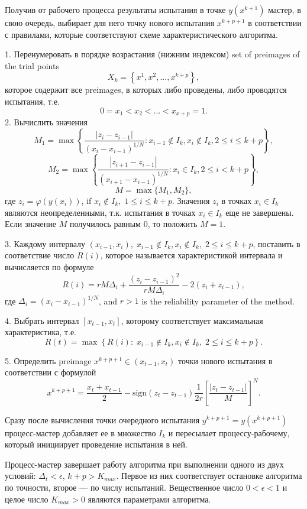 \documentclass{svproc}
\begin{document}
Получив от рабочего процесса результаты испытания в точке $y(x^{k+1})$ мастер, в свою очередь, выбирает для него точку нового испытания $x^{k+p+1}$ в соответствии с правилами, которые соответствуют схеме характеристического алгоритма.

1. Перенумеровать в порядке возрастания (нижним индексом) set of preimages of the trial points 
\[
X_k = \left\{x^1, x^2,...,x^{k+p} \right\},
\]
которое содержит все preimages, в которых либо проведены, либо проводятся испытания, т.е.
\[
0=x_1<x_2<...<x_{x+p}=1.
\]
2. Вычислить значения 
\[
M_1=\max \left\{ \frac{ \left|z_i - z_{i-1} \right|}{(x_i-x_{i-1})^{1/N}} : x_{i-1} \notin I_k, x_i \notin I_k, 2\leq i\leq k+p \right\},
\]
\[
M_2=\max \left\{ \frac{ \left|z_{i+1} - z_{i-1} \right|}{(x_{i+1}-x_{i-1})^{1/N}} : x_i \in I_k, 2\leq i < k+p \right\},
\]
\[
M=\max\{M_1,M_2\},
\]
где $z_i=\varphi(y(x_i))$, if $x_i \notin I_k, \; 1\leq i \leq k+p$. Значения $z_i$ в точках $x_i \in I_k$ являются неопределенными, т.к. испытания в точках $x_i \in I_k$ еще не завершены. Если значение $M$ получилось равным 0, то положить $M=1$.

3. Каждому интервалу $(x_{i-1},x_i), \; x_{i-1} \notin I_k, x_i \notin I_k, \; 2\leq i\leq k+p$, поставить в соответствие число $R(i)$, которое называется характеристикой интервала и вычисляется по формуле
\[
R(i)=rM\Delta_i+\frac{(z_i-z_{i-1})^2}{rM\Delta_i}-2(z_i+z_{i-1}),
\]
где $\Delta_i=\left(x_i-x_{i-1}\right)^{1/N}$, and $r>1$ is the reliability parameter of the method.

4. Выбрать интервал $[x_{t-1},x_t]$, которому соответствует максимальная характеристика, т.е.
\[
R(t) = \max \left\{ R(i): \; x_{i-1} \notin I_k, x_i \notin I_k, \; 2\leq i\leq k+p \right\}.
\]

5. Определить preimage $x^{k+p+1} \in (x_{t-1},x_t)$ точки нового испытания в соответствии с формулой
\[
x^{k+p+1} = \frac{x_{t}+x_{t-1}}{2} - \mathrm{sign}(z_{t}-z_{t-1})\frac{1}{2r}\left[\frac{\left|z_{t}-z_{t-1}\right|}{M}\right]^N.
\]

Сразу после вычисления точки очередного испытания $y^{k+p+1} = y(x^{k+p+1})$ процесс-мастер добавляет ее в множество $I_k$ и пересылает процессу-рабочему, который инициирует проведение испытания в ней. 

Процесс-мастер завершает работу алгоритма при выполнении одного из двух условий: $\Delta_{t}<\epsilon$, $k+p>K_{max}$.
Первое из них соответствует остановке алгоритма по точности, второе --- по числу испытаний. 
Вещественное число $0<\epsilon<1$ и целое число $K_{max}>0$ являются параметрами алгоритма.
\end{document}
